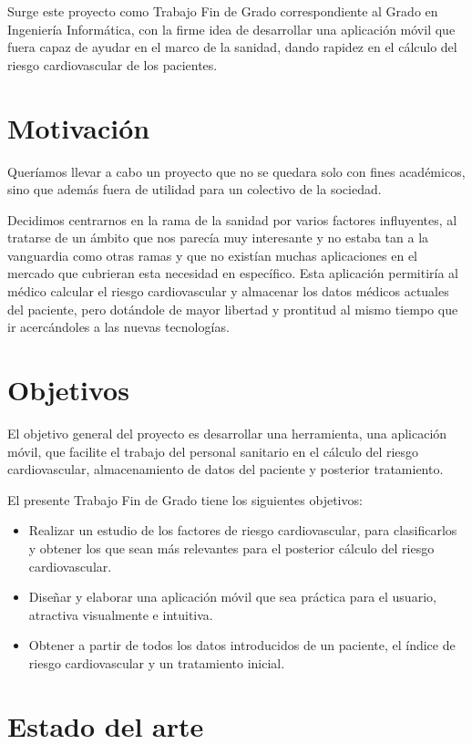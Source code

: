 \documentclass[11pt,spanish,
		listoftables,listoffigures]
		{tfgplantilla}
\begin{document}
Surge este proyecto como Trabajo Fin de Grado correspondiente al Grado en Ingeniería Informática, con la firme idea de desarrollar una aplicación móvil que fuera capaz de ayudar en el marco de la sanidad, dando rapidez en el cálculo del riesgo cardiovascular de los pacientes.

\section{Motivaci\'on}

Queríamos llevar a cabo un proyecto que no se quedara solo con fines académicos, sino que además fuera de utilidad para un colectivo de la sociedad. 

Decidimos centrarnos en la rama de la sanidad por varios factores influyentes, al tratarse de un ámbito que nos parecía muy interesante y no estaba tan a la vanguardia como otras ramas y que no existían muchas aplicaciones en el mercado que cubrieran esta necesidad en específico. 
Esta aplicación permitiría al médico calcular el riesgo cardiovascular y almacenar los datos médicos actuales del paciente, pero dotándole de mayor libertad y prontitud al mismo tiempo que ir acercándoles a las nuevas tecnologías.
\vfill

\section{Objetivos}

El objetivo general del proyecto es desarrollar una herramienta, una aplicación móvil, que facilite el trabajo del personal sanitario en el cálculo del riesgo cardiovascular, almacenamiento de datos del paciente y posterior tratamiento.

El presente Trabajo Fin de Grado tiene los siguientes objetivos:
\begin{itemize}
	\item Realizar un estudio de los factores de riesgo cardiovascular, para clasificarlos y obtener los que sean más relevantes para el posterior cálculo del riesgo cardiovascular.
	\item Diseñar y elaborar una aplicación móvil que sea práctica para el usuario, atractiva visualmente e intuitiva.
	\item Obtener a partir de todos los datos introducidos de un paciente, el índice de riesgo cardiovascular y un tratamiento inicial.
\end{itemize}

\section{Estado del arte}
\end{document}
